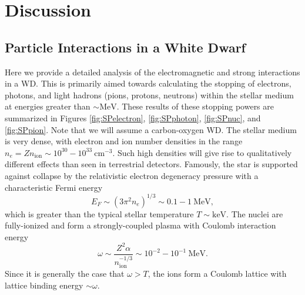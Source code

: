 \documentclass[twocolumn,showpacs,preprintnumbers,amsmath,amssymb,prd]{revtex4}
\newcommand{\MeV}{\text{MeV}}
\newcommand{\keV}{\text{keV}}
\newcommand{\cm}{\text{cm}}
\begin{document}
\section{Discussion}
\label{sec:Discussion}

\begin{appendices}

\section{Particle Interactions in a White Dwarf}
\label{sec:Appendix}
Here we provide a detailed analysis of the electromagnetic and strong interactions in a WD.
This is primarily aimed towards calculating the stopping of electrons, photons, and light hadrons (pions, protons, neutrons) within the stellar medium at energies greater than $\sim \text{MeV}$. 
These results of these stopping powers are summarized in Figures \ref{fig:SPelectron}, \ref{fig:SPphoton}, \ref{fig:SPnuc}, and \ref{fig:SPpion}.
Note that we will assume a carbon-oxygen WD.
The stellar medium is very dense, with electron and ion number densities in the range $n_e = Z n_\text{ion} \sim 10^{30} - 10^{33} ~\cm^{-3}$.  
Such high densities will give rise to qualitatively different effects than seen in terrestrial detectors. 
Famously, the star is supported against collapse by the relativistic electron degeneracy pressure with a characteristic Fermi energy
\begin{equation}
  E_F \sim (3 \pi^2 n_e)^{1/3} \sim 0.1 - 1 ~\MeV,
\end{equation}
which is greater than the typical stellar temperature $T \sim \keV$. 
The nuclei are fully-ionized and form a strongly-coupled plasma with Coulomb interaction energy
\begin{equation}
\label{eq:lattice}
  \omega \sim \frac{Z^2 \alpha}{n_\text{ion}^{-1/3}} 
         \sim 10^{-2} - 10^{-1} ~\MeV.
\end{equation}
Since it is generally the case that $\omega >T$, the ions form a Coulomb lattice with lattice binding energy $\sim \omega$. 



\end{appendices}
\end{document}
